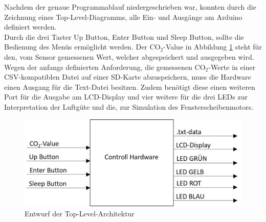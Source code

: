 \label{Toplevel}

Nachdem der genaue Programmablauf niedergeschrieben war, konnten durch die Zeichnung eines Top-Level-Diagramms, alle Ein- und Ausgänge am Arduino definiert werden. \\
Durch die drei Taster Up Button, Enter Button und Sleep Button, sollte die Bedienung des Menüs ermöglicht werden. Der CO$_2$-Value in Abbildung \ref{fig:Toplevel} steht für den, vom Sensor gemessenen Wert, welcher abgespeichert und ausgegeben wird. \\
Wegen der anfangs definierten Anforderung, die gemessenen CO$_2$-Werte in einer CSV-kompatiblen Datei auf einer SD-Karte abzuspeichern, muss die Hardware einen Ausgang für die Text-Datei besitzen. Zudem benötigt diese einen weiteren Port für die Ausgabe am \ac{LCD}-Display und vier weitere für die drei \ac{LED}s zur Interpretation der Luftgüte und die, zur Simulation des Fensterscheibenmotors. \\

\begin{figure}[!hbt]
	\centering
	\includegraphics[width=0.7\linewidth]{Images/Topleveldiagramm}
	\caption{Entwurf der Top-Level-Architektur}
	\label{fig:Toplevel}
\end{figure}

\newpage